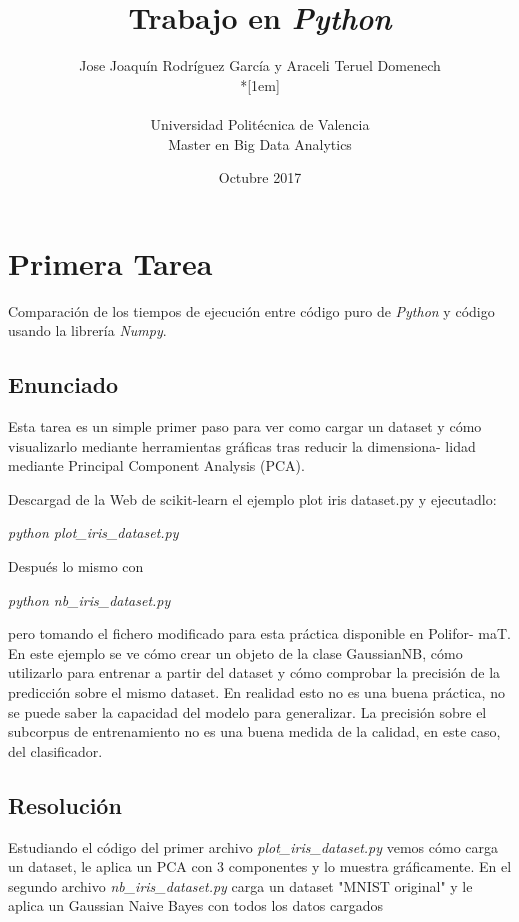 \documentclass[12pt,twoside]{article}
\title{Trabajo en \textit{Python}}
\author{Jose Joaquín Rodríguez García y Araceli Teruel Domenech\\*[1em]
\begin{minipage}{0.75\textwidth}
\footnotesize \itshape
\begin{center}
Universidad Politécnica de Valencia \\
Master en Big Data Analytics
\end{center}
\end{minipage}
}
\date{Octubre 2017}
\begin{document}
\maketitle


\section{Primera Tarea}

Comparación de los tiempos de ejecución entre código puro de \textit{Python} y código usando la librería \textit{Numpy}.

\subsection{Enunciado}

\noindent
Esta tarea es un simple primer paso para ver como cargar un dataset y
cómo visualizarlo mediante herramientas gráficas tras reducir la dimensiona-
lidad mediante Principal Component Analysis (PCA).

Descargad de la Web de scikit-learn el ejemplo plot iris dataset.py
y ejecutadlo:
\begin{center}
\textit{python plot_iris_dataset.py}
\end{center}

Después lo mismo con

\begin{center}
\textit{python nb_iris_dataset.py}
\end{center}

pero tomando el fichero modificado para esta práctica disponible en Polifor-
maT.
En este ejemplo se ve cómo crear un objeto de la clase GaussianNB, cómo
utilizarlo para entrenar a partir del dataset y cómo comprobar la precisión
de la predicción sobre el mismo dataset.
En realidad esto no es una buena práctica, no se puede saber la capacidad
del modelo para generalizar. La precisión sobre el subcorpus de entrenamiento
no es una buena medida de la calidad, en este caso, del clasificador.


\subsection{Resolución}

Estudiando el código del primer archivo \textit{plot_iris_dataset.py} vemos cómo carga un dataset, le aplica un PCA con 3 componentes y lo muestra gráficamente. 
En el segundo archivo \textit{nb_iris_dataset.py} carga un dataset "MNIST original" y le aplica un Gaussian Naive Bayes con todos los datos cargados
\end{document}
